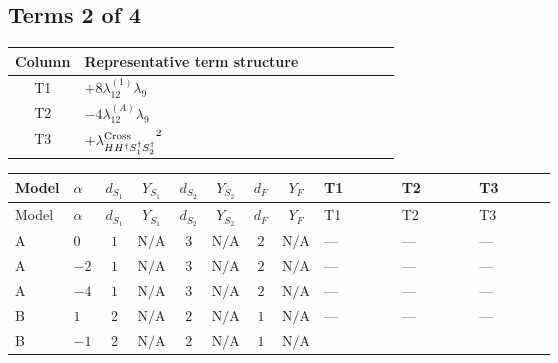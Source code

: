 \documentclass[8pt]{article}
\begin{document}
\begin{landscape}
\subsection*{Terms 2 of 4}
\begin{center}
\begin{tabular}{@{}c >{\raggedright\arraybackslash}p{0.82\linewidth}@{}}
\toprule
Column & Representative term structure \\
\midrule
T1 & \(\displaystyle +8 {\lambda_{12}^{(1)}} {\lambda_{9}}\) \\
\midrule
T2 & \(\displaystyle -4 {\lambda_{12}^{(A)}} {\lambda_{9}}\) \\
\midrule
T3 & \(\displaystyle +{\lambda_{H H^\dagger S_1^\dagger S_2^\dagger}^{\rm Cross}}^2\) \\
\midrule
\bottomrule
\end{tabular}
\end{center}
\smallskip
\tiny
\begin{longtable}{@{}llcccccc >{\raggedright\arraybackslash}p{0.21\linewidth} >{\raggedright\arraybackslash}p{0.21\linewidth} >{\raggedright\arraybackslash}p{0.21\linewidth}@{}}
\toprule
Model & $\alpha$ & $d_{S_1}$ & $Y_{S_1}$ & $d_{S_2}$ & $Y_{S_2}$ & $d_F$ & $Y_F$ & T1 & T2 & T3 \\
\midrule
\endfirsthead
\toprule
Model & $\alpha$ & $d_{S_1}$ & $Y_{S_1}$ & $d_{S_2}$ & $Y_{S_2}$ & $d_F$ & $Y_F$ & T1 & T2 & T3 \\
\midrule
\endhead
A & $0$ & $1$ & $\text{N/A}$ & $3$ & $\text{N/A}$ & $2$ & $\text{N/A}$ & --- & --- & --- \\
\midrule
A & $-2$ & $1$ & $\text{N/A}$ & $3$ & $\text{N/A}$ & $2$ & $\text{N/A}$ & --- & --- & --- \\
\midrule
A & $-4$ & $1$ & $\text{N/A}$ & $3$ & $\text{N/A}$ & $2$ & $\text{N/A}$ & --- & --- & --- \\
\midrule
B & $1$ & $2$ & $\text{N/A}$ & $2$ & $\text{N/A}$ & $1$ & $\text{N/A}$ & --- & --- & --- \\
\midrule
B & $-1$ & $2$ & $\text{N/A}$ & $2$ & $\text{N/A}$ & $1$ & $\text{N/A}$ & \scriptsize\adjustbox{max width=\linewidth}{$\begin{gathered} +8 {\lambda_{12}^{(1)}} {\lambda_{9}}\end{gathered}$} & \scriptsize\adjustbox{max width=\linewidth}{$\begin{gathered} -4 {\lambda_{12}^{(A)}} {\lambda_{9}}\end{gathered}$} & \scriptsize\adjustbox{max width=\linewidth}{$\begin{gathered} +{\lambda_{H H^\dagger S_1^\dagger S_2^\dagger}^{\rm Cross}}^2\end{gathered}$} \\

\end{longtable}
\end{landscape}
\end{document}
